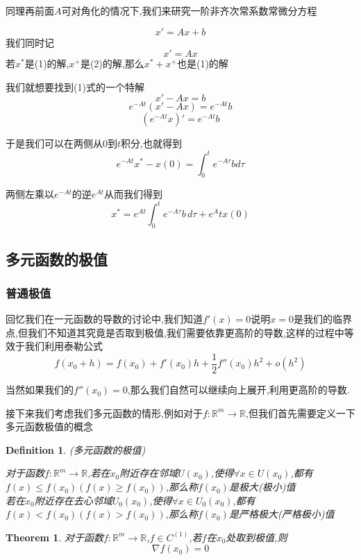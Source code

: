 \documentclass[11pt,hyperref,a4paper,UTF8]{ctexart}
\newtheorem{theorem}{Theorem}[subsection]
\newtheorem{definition}{Definition}[subsection]
\newcommand{\RR}{\mathbb{R}}
\newcommand{\parameter}[1]{\left(#1\right)}
\begin{document}
\begin{CJK}{UTF8}{gkai}
同理再前面$A$可对角化的情况下,我们来研究一阶非齐次常系数常微分方程

\begin{equation}
  x' = Ax + b
\end{equation}
我们同时记
\begin{equation}
  x' = Ax
\end{equation}
若$x^\ast$是(1)的解,$x^+$是(2)的解,那么$x^\ast + x^+$也是(1)的解

我们就想要找到(1)式的一个特解
\[x' - Ax = b\]
\[e^{-At}(x' - Ax) =  e^{-At} b\]
\[\parameter{e^{-At}x}' = e^{-At} b\]

于是我们可以在两侧从$0$到$t$积分,也就得到
\[e^{-At}x^\ast - x(0) = \int_{0}^{t}e^{-A\tau}b d\tau\]

两侧左乘以$e^{-At}$的逆$e^{At}$从而我们得到
\[x^\ast = e^{At} \int_{0}^{t} e^{-A\tau}b \, d\tau + e^At x(0)\]

\subsection{多元函数的极值}

\subsubsection{普通极值}
回忆我们在一元函数的导数的讨论中,我们知道$f'(x) = 0$说明$x = 0$是我们的临界点,但我们不知道其究竟是否取到极值,我们需要依靠更高阶的导数,这样的过程中等效于我们利用泰勒公式
\[f(x_0 + h) = f(x_0) + f'(x_0)h + \frac{1}{2}f''(x_0)h^2 + o(h^2)\]

当然如果我们的$f''(x_0) = 0$,那么我们自然可以继续向上展开,利用更高阶的导数.


接下来我们考虑我们多元函数的情形,例如对于$f:\RR^m \to \RR$,但我们首先需要定义一下多元函数极值的概念

\begin{definition}
  (多元函数的极值)

  对于函数$f:\RR^m \to \RR$,若在$x_0$附近存在邻域$U(x_0)$,使得$\forall x \in U(x_0)$,都有$f(x) \leq f(x_0)(f(x) \geq f(x_0))$,那么称$f(x_0)$是极大(极小)值\\

  若在$x_0$附近存在去心邻域$U_0(x_0)$,使得$\forall x \in U_0(x_0)$,都有$f(x) < f(x_0)(f(x) > f(x_0))$,那么称$f(x_0)$是严格极大(严格极小)值\\
\end{definition}

\begin{theorem}
  对于函数$f:\RR^m \to \RR$,$f \in C^{(1)}$,若$f$在$x_0$处取到极值,则
  \[\nabla f(x_0) = 0\]
\end{theorem}


\end{CJK}
\end{document}
